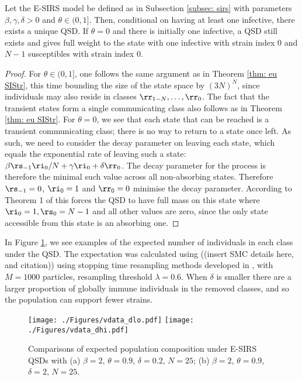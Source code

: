 \documentclass[smallextended]{svjour3}       %
\begin{document}
\begin{mythm}\label{thm: eu SIRStr}
	Let the E-SIRS model be defined as in Subsection \ref{subsec: sirs} with parameters $\beta, \gamma, \delta > 0$ and $\theta \in (0,1]$. Then, conditional on having at least one infective, there exists a unique QSD. If $\theta = 0$ and there is initially one infective, a QSD still exists and gives full weight to the state with one infective with strain index $0$ and $N-1$ susceptibles with strain index $0$.
\end{mythm}
\begin{proof}
	For $\theta \in (0,1]$, one follows the same argument as in Theorem \ref{thm: eu SIStr}, this time bounding the size of the state space by $(3N)^N$, since individuals may also reside in classes $\rr_{1-N}, \dots, \rr_0$. The fact that the transient states form a single communicating class also follows as in Theorem \ref{thm: eu SIStr}.
	For $\theta = 0$, we see that each state that can be reached is a transient communicating class; there is no way to return to a state once left. As such, we need to consider the decay parameter on leaving each state, which equals the exponential rate of leaving such a state: $\beta \rs_{-1} \ri_{0} /N + \gamma \ri_0 + \delta \rr_0$. The decay parameter for the process is therefore the minimal such value across all non-absorbing states. Therefore $\rs_{-1} = 0$, $\ri_0 = 1$ and $\rr_0 = 0$ minimise the decay parameter. According to Theorem 1 of \cite{vanDoorn2008} this forces the QSD to have full mass on this state where $\ri_0 = 1, \rs_0 = N-1$ and all other values are zero, since the only state accessible from this state is an absorbing one.
\end{proof}

In Figure \ref{fig: example sirs}, we see examples of the expected number of individuals in each class under the QSD. The expectation was calculated using ((insert SMC details here, and citation)) using stopping time resampling methods developed in \cite{griffin2016}, with $M=1000$ particles, resampling threshold $\lambda=0.6$.
When $\delta$ is smaller there are a larger proportion of globally immune individuals in the removed classes, and so the population can support fewer strains.

\begin{figure}[t!]
	\centering
 		\texttt{[image: ./Figures/vdata\_dlo.pdf]}
 		\texttt{[image: ./Figures/vdata\_dhi.pdf]}
	\caption{Comparisons of expected population composition under E-SIRS QSDs with (a) $\beta = 2$, $\theta = 0.9$, $\delta=0.2$, $N = 25$; (b) $\beta=2$, $\theta = 0.9$, $\delta=2$, $N=25$.}
	\label{fig: example sirs}
\end{figure}
\end{document}
